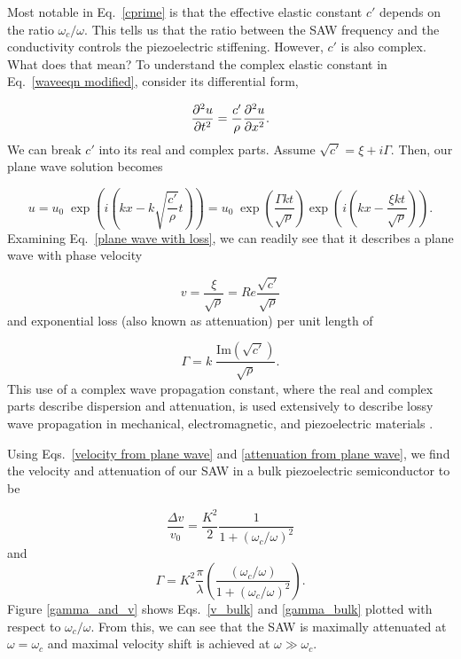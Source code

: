 \documentclass[double,12pt,1in,seploa]{beavtex}
\begin{document}
Most notable in Eq.\ \ref{cprime} is that the effective elastic constant $c'$ depends on the ratio $\omega_c/\omega$. This tells us that the ratio between the SAW frequency and the conductivity controls the piezoelectric stiffening. However, $c'$ is also complex. What does that mean? To understand the complex elastic constant in Eq.\ \ref{waveeqn modified}, consider its differential form,

\begin{equation}
    \pdv[2]{u}{t} = \frac{c'}{\rho} \pdv[2]{u}{x}.
\end{equation}
We can break $c'$ into its real and complex parts. Assume $\sqrt{c'} = \xi + i\Gamma$. Then, our plane wave solution becomes

\begin{equation}
    u = u_0 \; \exp\left(i(kx-k\sqrt{\frac{c'}{\rho}}t)\right)
    = u_0 \; \exp\left(\frac{\Gamma k t}{\sqrt{\rho}}\right) \exp\left(i(kx - \frac{\xi kt}{\sqrt{\rho}})\right). \label{plane wave with loss}
\end{equation}
Examining Eq.\ \ref{plane wave with loss}, we can readily see that it describes a plane wave with phase velocity 

\begin{equation}
    v = \frac{\xi}{\sqrt{\rho}} = Re{\frac{\sqrt{c'}}{\sqrt{\rho}}} \label{velocity from plane wave}
\end{equation} 
and exponential loss (also known as attenuation) per unit length of 

\begin{equation}
    \Gamma = k \; \frac{\mathrm{Im}(\sqrt{c'})}{\sqrt{\rho}}. \label{attenuation from plane wave}
\end{equation} 
This use of a complex wave propagation constant, where the real and complex parts describe dispersion and attenuation, is used extensively to describe lossy wave propagation in mechanical, electromagnetic, and piezoelectric materials \cite{holland_representation_1967} \cite[p.\ 18]{pozar_microwave_2012} \cite{weinreich_acoustodynamic_1956, gonzalez_revisiting_2016}. 

Using Eqs.\ \ref{velocity from plane wave} and \ref{attenuation from plane wave}, we find the velocity and attenuation of our SAW in a bulk piezoelectric semiconductor to be

\begin{equation}
    \frac{\Delta v}{v_0} = \frac{K^2}{2}\frac{1}{1+(\omega_c/\omega)^2} \label{v_bulk}
\end{equation}
and
\begin{equation}
    \Gamma = K^2 \frac{\pi}{\lambda}\left(\frac{(\omega_c/\omega)}{1+(\omega_c/\omega)^2}\right). \label{gamma_bulk}
\end{equation}
Figure \ref{gamma_and_v} shows Eqs.\ \ref{v_bulk} and \ref{gamma_bulk} plotted with respect to  $\omega_c/\omega$. From this, we can see that the SAW is maximally attenuated at $\omega = \omega_c$ and maximal velocity shift is achieved at $\omega \gg \omega_c$.
\end{document}
